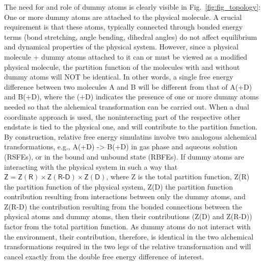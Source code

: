\documentclass[9pt,bestpractices]{livecoms}
\begin{document}
The need for and role of dummy atoms is clearly visible in Fig.~\ref{fig:fig_topology}: One or more dummy atoms are attached to the physical molecule. A crucial requirement is that these atoms, typically connected through bonded energy terms (bond stretching, angle bending, dihedral angles) do not affect equilibrium and dynamical properties of the physical system. However, since a physical molecule + dummy atoms attached to it can or must be viewed as a modified physical molecule, the partition function of the molecules with and without dummy atoms will NOT be identical. In other words, a single free energy difference between two molecules A and B will be different from that of A(+D) and B(+D), where the (+D) indicates the presence of one or more dummy atoms needed so that the alchemical transformation can be carried out. When a dual coordinate approach is used, the noninteracting part of the respective other endstate is tied to the physical one, and will contribute to the partition function. By construction, relative free energy simulatins involve two analogous alchemical transformations, e.g., A(+D) -> B(+D) in gas phase and aqueous solution (RSFEs), or in the bound and unbound state (RBFEs). If dummy atoms are interacting with the physical system in such a way that $\mathsf{Z = Z(R) \times Z(R\text{-}D) \times Z(D)}$, where Z is the total partition function, Z(R) the partition function of the physical system, Z(D) the partition function contribution resulting from interactions between only the dummy atoms, and Z(R-D) the contribution resulting from the bonded connections between the physical atoms and dummy atoms, then their contributions (Z(D) and Z(R-D)) factor from the total partition function. As dummy atoms do not interact with the environment, their contribution, therefore, is identical in the two alchemical transformations required in the two legs of the relative transformation and will cancel exactly from the double free energy difference of interest.
\end{document}
